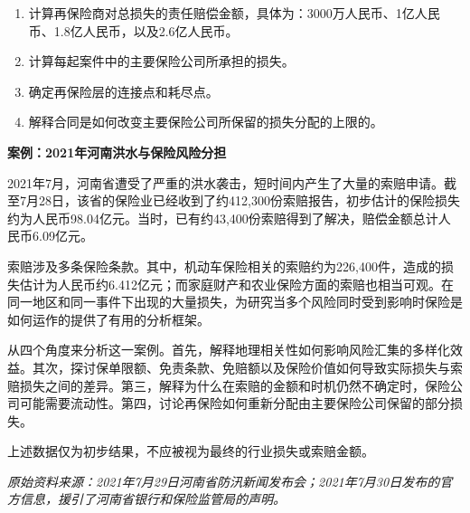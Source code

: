 \begin{enumerate}
\begin{enumerate}
\item 计算再保险商对总损失的责任赔偿金额，具体为：3000万人民币、1亿人民币、1.8亿人民币，以及2.6亿人民币。

\item 计算每起案件中的主要保险公司所承担的损失。

\item 确定再保险层的连接点和耗尽点。

\item 解释合同是如何改变主要保险公司所保留的损失分配的上限的。

\end{enumerate}

\end{enumerate}




\textbf{案例：2021年河南洪水与保险风险分担}

2021年7月，河南省遭受了严重的洪水袭击，短时间内产生了大量的索赔申请。截至7月28日，该省的保险业已经收到了约412,300份索赔报告，初步估计的保险损失约为人民币98.04亿元。当时，已有约43,400份索赔得到了解决，赔偿金额总计人民币6.09亿元。

索赔涉及多条保险条款。其中，机动车保险相关的索赔约为226,400件，造成的损失估计为人民币约6.412亿元；而家庭财产和农业保险方面的索赔也相当可观。在同一地区和同一事件下出现的大量损失，为研究当多个风险同时受到影响时保险是如何运作的提供了有用的分析框架。

从四个角度来分析这一案例。首先，解释地理相关性如何影响风险汇集的多样化效益。其次，探讨保单限额、免责条款、免赔额以及保险价值如何导致实际损失与索赔损失之间的差异。第三，解释为什么在索赔的金额和时机仍然不确定时，保险公司可能需要流动性。第四，讨论再保险如何重新分配由主要保险公司保留的部分损失。

上述数据仅为初步结果，不应被视为最终的行业损失或索赔金额。

\emph{原始资料来源：2021年7月29日河南省防汛新闻发布会；2021年7月30日发布的官方信息，援引了河南省银行和保险监管局的声明。}




